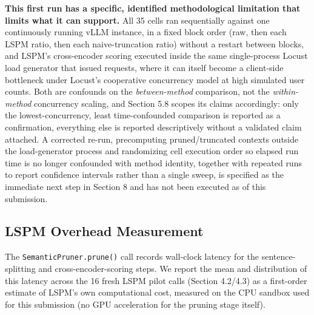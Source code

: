 \textbf{This first run has a specific, identified methodological limitation that limits what it can support.} All 35 cells ran sequentially against one continuously running vLLM instance, in a fixed block order (raw, then each LSPM ratio, then each naive-truncation ratio) without a restart between blocks, and LSPM's cross-encoder scoring executed inside the same single-process Locust load generator that issued requests, where it can itself become a client-side bottleneck under Locust's cooperative concurrency model at high simulated user counts. Both are confounds on the \textit{between-method} comparison, not the \textit{within-method} concurrency scaling, and Section 5.8 scopes its claims accordingly: only the lowest-concurrency, least time-confounded comparison is reported as a confirmation, everything else is reported descriptively without a validated claim attached. A corrected re-run, precomputing pruned/truncated contexts outside the load-generator process and randomizing cell execution order so elapsed run time is no longer confounded with method identity, together with repeated runs to report confidence intervals rather than a single sweep, is specified as the immediate next step in Section 8 and has not been executed as of this submission.

\subsection{LSPM Overhead Measurement}
The \texttt{SemanticPruner.prune()} call records wall-clock latency for the sentence-splitting and cross-encoder-scoring steps. We report the mean and distribution of this latency across the 16 fresh LSPM pilot calls (Section 4.2/4.3) as a first-order estimate of LSPM's own computational cost, measured on the CPU sandbox used for this submission (no GPU acceleration for the pruning stage itself).


